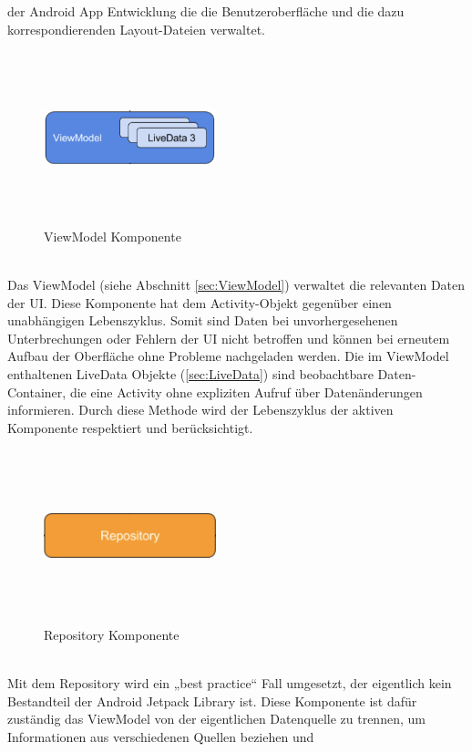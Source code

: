 der Android App Entwicklung die die Benutzeroberfläche und die dazu korrespondierenden Layout-Dateien verwaltet. 
\begin{figure}[hbt!]
    \centering
    \includegraphics[width=5cm,height=5cm,keepaspectratio]{2GrundlagenX/Bilder/viewModelComp.png}
    \caption{ViewModel Komponente \cite{aac.2020j}}
    \label{pic:vmComp}
\end{figure} 
\\ 
Das ViewModel (siehe Abschnitt \ref{sec:ViewModel}) verwaltet die relevanten Daten der UI. Diese Komponente hat dem Activity-Objekt gegenüber 
einen unabhängigen Lebenszyklus. Somit sind Daten bei unvorhergesehenen Unterbrechungen oder Fehlern der UI nicht betroffen und können bei 
erneutem Aufbau der Oberfläche ohne Probleme nachgeladen werden. Die im ViewModel enthaltenen LiveData Objekte (\ref{sec:LiveData}) sind 
beobachtbare Daten-Container, die eine Activity ohne expliziten Aufruf über Datenänderungen informieren. Durch diese Methode wird der 
Lebenszyklus der aktiven Komponente respektiert und berücksichtigt. 
\begin{figure}[hbt!]
    \centering
    \includegraphics[width=5cm,height=5cm,keepaspectratio]{2GrundlagenX/Bilder/repoComp.png}
    \caption{Repository Komponente \cite{aac.2020j}}
    \label{pic:repoComp}
\end{figure} 
\\ 
Mit dem Repository wird ein „best practice“ Fall umgesetzt, der eigentlich kein Bestandteil der Android Jetpack Library ist. Diese Komponente 
ist dafür zuständig das ViewModel von der eigentlichen Datenquelle zu trennen, um Informationen aus verschiedenen Quellen beziehen und 
